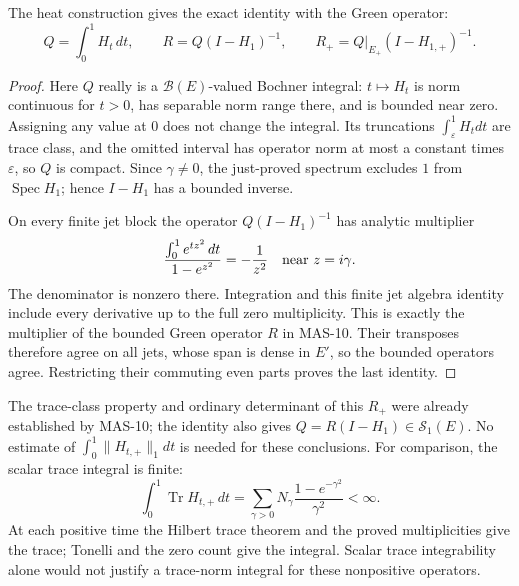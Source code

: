 \documentclass[11pt,a4paper]{article}
\newcommand{\Tr}{\operatorname{Tr}}
\newcommand{\fid}[1]{\textsf{#1}}
\begin{document}
The heat construction gives the exact identity with the Green operator:
\begin{equation}\label{eq:MasHeatInverse}
 Q=\int_0^1H_t\,dt,\qquad
 R=Q(I-H_1)^{-1},\qquad
 R_+=Q|_{E_+}(I-H_{1,+})^{-1}.
\end{equation}
\begin{proof}
Here $Q$ really is a $\mathcal B(E)$-valued Bochner integral: $t\mapsto H_t$ is norm continuous for $t>0$, has separable norm range there, and is bounded near zero. Assigning any value at $0$ does not change the integral. Its truncations $\int_\varepsilon^1H_tdt$ are trace class, and the omitted interval has operator norm at most a constant times $\varepsilon$, so $Q$ is compact. Since $\gamma\ne0$, the just-proved spectrum excludes $1$ from $\operatorname{Spec}H_1$; hence $I-H_1$ has a bounded inverse.

On every finite jet block the operator $Q(I-H_1)^{-1}$ has analytic multiplier
\[
 \frac{\int_0^1e^{tz^2}\,dt}{1-e^{z^2}}=-\frac1{z^2}
 \quad\hbox{near }z=i\gamma.
\]
The denominator is nonzero there. Integration and this finite jet algebra identity include every derivative up to the full zero multiplicity. This is exactly the multiplier of the bounded Green operator $R$ in \fid{MAS-10}. Their transposes therefore agree on all jets, whose span is dense in $E'$, so the bounded operators agree. Restricting their commuting even parts proves the last identity.
\end{proof}
The trace-class property and ordinary determinant of this $R_+$ were already established by \fid{MAS-10}; the identity also gives $Q=R(I-H_1)\in\mathcal S_1(E)$. No estimate of $\int_0^1\|H_{t,+}\|_1dt$ is needed for these conclusions. For comparison, the scalar trace integral is finite:
\[
 \int_0^1\Tr H_{t,+}\,dt
 =\sum_{\gamma>0}N_\gamma\frac{1-e^{-\gamma^2}}{\gamma^2}<\infty.
\]
At each positive time the Hilbert trace theorem and the proved multiplicities give the trace; Tonelli and the zero count give the integral. Scalar trace integrability alone would not justify a trace-norm integral for these nonpositive operators.
\end{document}
